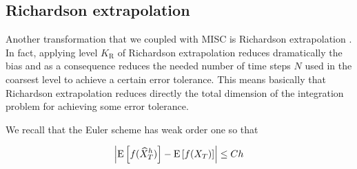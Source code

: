 


%


\subsection{Richardson extrapolation}\label{sec:Richardson extrapolation}


Another transformation that we coupled with MISC is Richardson extrapolation \cite{talay1990expansion}. In fact, applying level $K_\text{R}$ of Richardson extrapolation reduces dramatically the bias and as a consequence reduces the needed number of time steps $N$ used in the coarsest level to achieve a certain error tolerance. This means basically that Richardson extrapolation reduces directly the total dimension of the integration problem for achieving some error tolerance.


We  recall that the Euler scheme has weak order one so that

\begin{align}\label{Euler_weak_error}
	\left\lvert\mathrm{E}\left[f(\widehat{X}_T^h)\right]-\mathrm{E}\left[f(X_T)\right] \right\rvert  \leq C h
\end{align}

